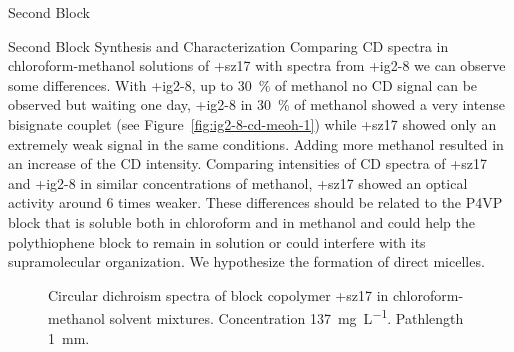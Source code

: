 \begin{section}{Second Block}
\begin{subsection}{Second Block Synthesis and Characterization}
Comparing \gls{CD} spectra in chloroform-methanol solutions of \cmpd+{sz17} with spectra from \cmpd+{ig2-8} we can observe some differences. With \cmpd+{ig2-8}, up to 30~\% of methanol no \gls{CD} signal can be observed but waiting one day, \cmpd+{ig2-8} in 30~\% of methanol showed a very intense bisignate couplet (see Figure~\ref{fig:ig2-8-cd-meoh-1}) while \cmpd+{sz17} showed only an extremely weak signal in the same conditions. 
Adding more methanol resulted in an increase of the \gls{CD} intensity. Comparing intensities of \gls{CD} spectra of \cmpd+{sz17} and \cmpd+{ig2-8} in similar concentrations of methanol, \cmpd+{sz17} showed an optical activity around 6 times weaker. 
These differences should be related to the \gls{P4VP} block that is soluble both in chloroform and in methanol and could help the polythio\-phene block to remain in solution or could interfere with its supramolecular organization. We hypothesize the formation of direct micelles. 

\begin{figure}[tbp]%
 \caption{Circular dichroism spectra of block copolymer \cmpd+{sz17} in chloroform-methanol solvent mixtures. Concentration \SI{137}{\mg\per\liter}. Pathlength \SI{1}{\mm}.}
\label{fig:sz17-cd}
\end{figure}

\end{subsection}
\end{section} 
